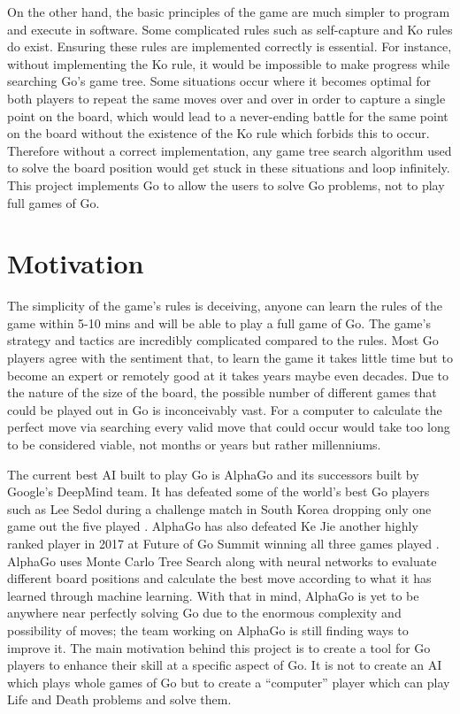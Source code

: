 \documentclass{l4proj}
\begin{document}
On the other hand, the basic principles of the game are much simpler to program and execute in software. Some complicated rules such as self-capture and Ko rules do exist. Ensuring these rules are implemented correctly is essential. For instance, without implementing the Ko rule, it would be impossible to make progress while searching Go’s game tree. Some situations occur where it becomes optimal for both players to repeat the same moves over and over in order to capture a single point on the board, which would lead to a never-ending battle for the same point on the board without the existence of the Ko rule which forbids this to occur. Therefore without a correct implementation, any game tree search algorithm used to solve the board position would get stuck in these situations and loop infinitely. This project implements Go to allow the users to solve Go problems, not to play full games of Go.

\section{Motivation}
The simplicity of the game's rules is deceiving, anyone can learn the rules of the game within 5-10 mins and will be able to play a full game of Go. The game's strategy and tactics are incredibly complicated compared to the rules. Most Go players agree with the sentiment that, to learn the game it takes little time but to become an expert or remotely good at it takes years maybe even decades. Due to the nature of the size of the board, the possible number of different games that could be played out in Go is inconceivably vast. For a computer to calculate the perfect move via searching every valid move that could occur would take too long to be considered viable, not months or years but rather millenniums.

The current best AI built to play Go is AlphaGo \citep{AlphaGo} and its successors built by Google’s DeepMind team. It has defeated some of the world’s best Go players such as Lee Sedol during a challenge match in South Korea dropping only one game out the five played \citep{AlphaGoLeeSedol}. AlphaGo has also defeated Ke Jie another highly ranked player in 2017 at Future of Go Summit winning all three games played \citep{AlphaGoKeJie}. AlphaGo uses Monte Carlo Tree Search along with neural networks to evaluate different board positions and calculate the best move according to what it has learned through machine learning. With that in mind, AlphaGo is yet to be anywhere near perfectly solving Go due to the enormous complexity and possibility of moves; the team working on AlphaGo is still finding ways to improve it.
The main motivation behind this project is to create a tool for Go players to enhance their skill at a specific aspect of Go. It is not to create an AI which plays whole games of Go but to create a “computer” player which can play Life and Death problems and solve them.
\end{document}
